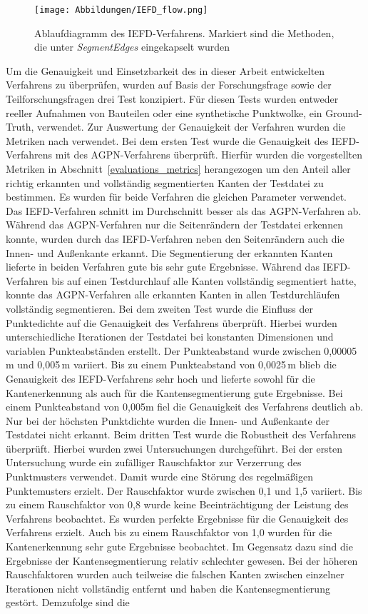 \begin{figure}[t]
	\texttt{[image: Abbildungen/IEFD\_flow.png]}
	\centering
	\caption[Ablauf des Verfahrens dieser Arbeit]{Ablaufdiagramm des IEFD-Verfahrens. Markiert sind die Methoden, die unter \textit{SegmentEdges} eingekapselt wurden}
	\label{fig:iefd_flow}
\end{figure}

Um die Genauigkeit und Einsetzbarkeit des in dieser Arbeit entwickelten Verfahrens zu überprüfen, wurden auf Basis der Forschungsfrage sowie der Teilforschungsfragen drei Test konzipiert. Für diesen Tests wurden entweder reeller Aufnahmen von Bauteilen oder eine synthetische Punktwolke, ein Ground-Truth, verwendet. Zur Auswertung der Genauigkeit der Verfahren wurden die Metriken nach \autocite[13]{ni_edge_2016} verwendet. Bei dem ersten Test wurde die Genauigkeit des IEFD-Verfahrens mit des AGPN-Verfahrens überprüft. Hierfür wurden die vorgestellten Metriken in Abschnitt~\ref{evaluations_metrics} herangezogen um den Anteil aller richtig erkannten und vollständig segmentierten Kanten der Testdatei zu bestimmen. Es wurden für beide Verfahren die gleichen Parameter verwendet. Das IEFD-Verfahren schnitt im Durchschnitt besser als das AGPN-Verfahren ab. Während das AGPN-Verfahren nur die Seitenrändern der Testdatei erkennen konnte, wurden durch das IEFD-Verfahren neben den Seitenrändern auch die Innen- und Außenkante erkannt. Die Segmentierung der erkannten Kanten lieferte in beiden Verfahren gute bis sehr gute Ergebnisse. Während das IEFD-Verfahren bis auf einen Testdurchlauf alle Kanten vollständig segmentiert hatte, konnte das AGPN-Verfahren alle erkannten Kanten in allen Testdurchläufen vollständig segmentieren. Bei dem zweiten Test wurde die Einfluss der Punktedichte auf die Genauigkeit des Verfahrens überprüft. Hierbei wurden unterschiedliche Iterationen der Testdatei bei konstanten Dimensionen und variablen Punkteabständen erstellt. Der Punkteabstand wurde zwischen 0,00005\,\si{\m} und 0,005\,\si{\m} variiert. Bis zu einem Punkteabstand von 0,0025\,\si{\m} blieb die Genauigkeit des IEFD-Verfahrens sehr hoch und lieferte sowohl für die Kantenerkennung als auch für die Kantensegmentierung gute Ergebnisse. Bei einem Punkteabstand von 0,005m fiel die Genauigkeit des Verfahrens deutlich ab. Nur bei der höchsten Punktdichte wurden die Innen- und Außenkante der Testdatei nicht erkannt. Beim dritten Test wurde die Robustheit des Verfahrens überprüft. Hierbei wurden zwei Untersuchungen durchgeführt. Bei der ersten Untersuchung wurde ein zufälliger Rauschfaktor zur Verzerrung des Punktmusters verwendet. Damit wurde eine Störung des regelmäßigen Punktemusters erzielt. Der Rauschfaktor wurde zwischen 0,1 und 1,5 variiert. Bis zu einem Rauschfaktor von 0,8 wurde keine Beeinträchtigung der Leistung des Verfahrens beobachtet. Es wurden perfekte Ergebnisse für die Genauigkeit des Verfahrens erzielt. Auch bis zu einem Rauschfaktor von 1,0 wurden für die Kantenerkennung sehr gute Ergebnisse beobachtet. Im Gegensatz dazu sind die Ergebnisse der Kantensegmentierung relativ schlechter gewesen. Bei der höheren Rauschfaktoren wurden auch teilweise die falschen Kanten zwischen einzelner Iterationen nicht vollständig entfernt und haben die Kantensegmentierung gestört. Demzufolge sind die 